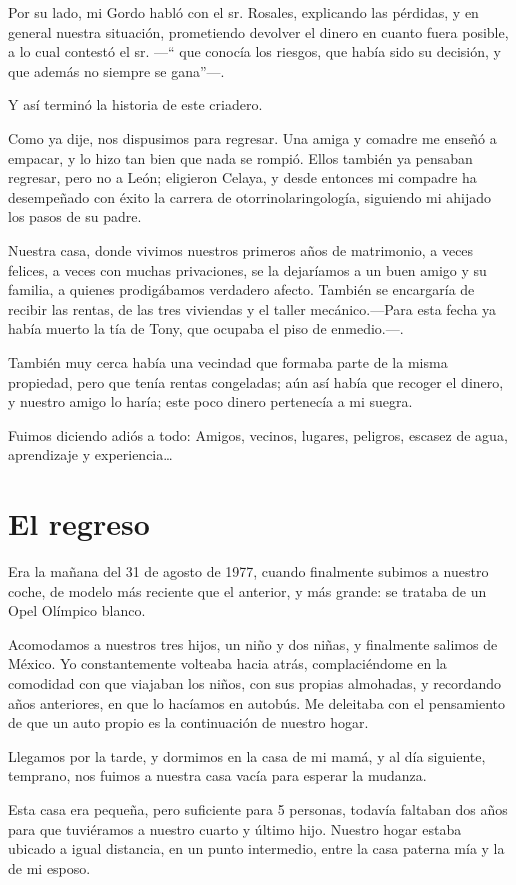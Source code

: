 \documentclass[letterpaper, 12pt]{book}
\begin{document}
Por su lado, mi Gordo habló con el sr. Rosales, explicando las pérdidas, y en general nuestra situación, prometiendo devolver el dinero en cuanto fuera posible, a lo cual contestó el sr. ---`` que conocía los riesgos, que había  sido su decisión, y que además no siempre se gana''---.

Y así terminó la historia de este criadero.

Como ya dije, nos dispusimos para regresar. Una amiga y comadre me enseñó a empacar, y lo hizo tan bien que nada se rompió. Ellos también ya pensaban regresar, pero no a León; eligieron Celaya, y desde entonces mi compadre ha desempeñado con éxito la carrera de otorrinolaringología, siguiendo mi ahijado los pasos de su padre.

Nuestra casa, donde vivimos nuestros primeros años de matrimonio, a veces felices, a veces con muchas privaciones, se la dejaríamos a un buen amigo y su familia, a quienes prodigábamos verdadero afecto. También se encargaría de recibir las rentas, de las tres viviendas y el taller mecánico.---Para esta fecha ya había muerto la tía de Tony, que ocupaba el piso de enmedio.---.

También muy cerca había una vecindad que formaba parte de la misma propiedad, pero que tenía rentas congeladas; aún así había que recoger el dinero, y nuestro amigo lo haría; este poco dinero pertenecía a mi suegra.

Fuimos diciendo adiós a todo: Amigos, vecinos, lugares, peligros, escasez de agua, aprendizaje y experiencia\ldots
\chapter{El regreso}
Era la mañana del 31 de agosto de 1977, cuando finalmente subimos a nuestro coche, de modelo más reciente que el anterior, y más grande: se trataba de un Opel Olímpico blanco.

Acomodamos a nuestros tres hijos, un niño y dos niñas, y finalmente salimos de México. Yo constantemente volteaba hacia atrás, complaciéndome en la comodidad con que viajaban los niños, con sus propias almohadas, y recordando años anteriores, en que lo hacíamos en autobús. Me deleitaba con el pensamiento de que un auto propio es la continuación de nuestro hogar.

Llegamos por la tarde, y dormimos en la casa de mi mamá, y al día siguiente, temprano, nos fuimos a nuestra casa vacía para esperar la mudanza.

Esta casa era pequeña, pero suficiente para 5 personas, todavía faltaban dos años para que tuviéramos a nuestro cuarto y último hijo. Nuestro hogar estaba ubicado a igual distancia, en un punto intermedio, entre la casa paterna mía y la de mi esposo.
\end{document}
